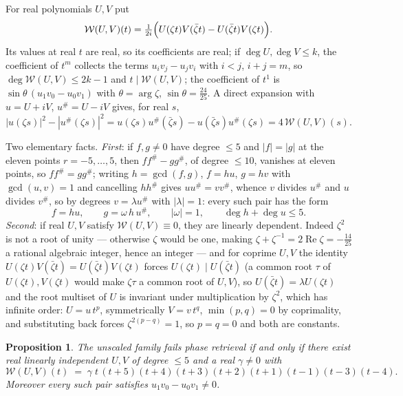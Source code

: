 \documentclass[10pt]{amsart}
\newtheorem{proposition}[theorem]{Proposition}
\begin{document}
For real polynomials $U,V$ put
\[
\mathcal W(U,V)(t)
=\tfrac1{2i}\Bigl(U(\zeta t)V(\bar\zeta t)-U(\bar\zeta
t)V(\zeta t)\Bigr).
\]
Its values at real $t$ are real, so its coefficients are real; if
$\deg U,\deg V\le k$, the coefficient of $t^m$ collects the terms
$u_iv_j-u_jv_i$ with $i<j$, $i+j=m$, so $\deg\mathcal W(U,V)\le2k-1$
and $t\mid\mathcal W(U,V)$; the coefficient of $t^1$ is
$\sin\theta\,(u_1v_0-u_0v_1)$ with $\theta=\arg\zeta$,
$\sin\theta=\tfrac{24}{25}$. A direct expansion with $u=U+iV$,
$u^{\#}=U-iV$ gives, for real $s$,
\begin{equation}\label{eq:fourdelta}
|u(\zeta s)|^2-|u^{\#}(\zeta s)|^2
=u(\zeta s)u^{\#}(\bar\zeta s)-u(\bar\zeta s)u^{\#}(\zeta s)
=4\,\mathcal W(U,V)(s).
\end{equation}

Two elementary facts. \emph{First}: if $f,g\neq0$ have degree $\le5$
and $|f|=|g|$ at the eleven points $r=-5,\dots,5$, then
$ff^{\#}-gg^{\#}$, of degree $\le10$, vanishes at eleven points, so
$ff^{\#}=gg^{\#}$; writing $h=\gcd(f,g)$, $f=hu$, $g=hv$ with
$\gcd(u,v)=1$ and cancelling $hh^{\#}$ gives $uu^{\#}=vv^{\#}$, whence
$v$ divides $u^{\#}$ and $u$ divides $v^{\#}$, so by degrees
$v=\lambda u^{\#}$ with $|\lambda|=1$: every such pair has the form
\begin{equation}\label{eq:normalform}
f=hu,\qquad g=\omega\,h\,u^{\#},\qquad|\omega|=1,\qquad \deg h+\deg
u\le5 .
\end{equation}
\emph{Second}: if real $U,V$ satisfy $\mathcal W(U,V)\equiv0$, they
are linearly dependent. Indeed $\zeta^2$ is not a root of unity ---
otherwise $\zeta$ would be one, making
$\zeta+\zeta^{-1}=2\operatorname{Re}\zeta=-\tfrac{14}{25}$ a rational
algebraic integer, hence an integer --- and for coprime $U,V$ the
identity $U(\zeta t)V(\bar\zeta t)=U(\bar\zeta t)V(\zeta t)$ forces
$U(\zeta t)\mid U(\bar\zeta t)$ (a common root $\tau$ of $U(\zeta t),
V(\zeta t)$ would make $\zeta\tau$ a common root of $U,V$), so
$U(\bar\zeta t)=\lambda U(\zeta t)$ and the root multiset of $U$ is
invariant under multiplication by $\zeta^2$, which has infinite order:
$U=u\,t^p$, symmetrically $V=v\,t^q$, $\min(p,q)=0$ by coprimality,
and substituting back forces $\zeta^{2(p-q)}=1$, so $p=q=0$ and both
are constants.

\begin{proposition}\label{prop:reduction}
The unscaled family fails phase retrieval if and only if there exist
real linearly independent $U,V$ of degree $\le5$ and a real
$\gamma\neq0$ with
\begin{equation}\label{eq:standard}
\mathcal W(U,V)(t)\;=\;\gamma\;t\,(t+5)(t+4)(t+3)(t+2)(t+1)(t-1)(t-3)(t-4).
\end{equation}
Moreover every such pair satisfies $u_1v_0-u_0v_1\neq0$.
\end{proposition}
\end{document}
